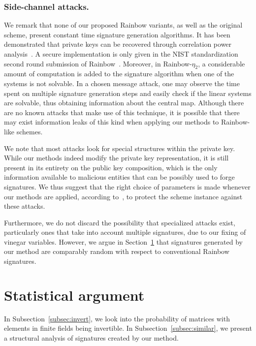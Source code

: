 \documentclass[12pt, a4paper, oneside]{memoir}
\theoremstyle{definition}
\begin{document}
\subsubsection{Side-channel attacks.} 

We remark that none of our proposed Rainbow variants, as well as the original scheme, present constant time signature generation algorithms. It has been demonstrated that private keys can be recovered through correlation power analysis~\cite{Park:201808}. A secure implementation is only given in the NIST standardization second round submission of Rainbow~\cite{Ding:201901}. Moreover, in Rainbow-$\eta_2$, a considerable amount of computation is added to the signature algorithm when one of the systems is not solvable. In a chosen message attack, one may observe the time spent on multiple signature generation steps and easily check if the linear systems are solvable, thus obtaining information about the central map. Although there are no known attacks that make use of this technique, it is possible that there may exist information leaks of this kind when applying our methods to Rainbow-like schemes.

\vspace{4mm}\noindent
We note that most attacks look for special structures within the private key. While our methods indeed modify the private key representation, it is still present in its entirety on the public key composition, which is the only information available to malicious entities that can be possibly used to forge signatures. We thus suggest that the right choice of parameters is made whenever our methods are applied, according to~\cite{Petzoldt:201005}, to protect the scheme instance against these attacks.

Furthermore, we do not discard the possibility that specialized attacks exist, particularly ones that take into account multiple signatures, due to our fixing of vinegar variables. However, we argue in Section~\ref{sec:stats} that signatures generated by our method are comparably random with respect to conventional Rainbow signatures. 

\section{Statistical argument}\label{sec:stats}

In Subsection~\ref{subsec:invert}, we look into the probability of matrices with elements in finite fields being invertible. In Subsection~\ref{subsec:similar}, we present a structural analysis of signatures created by our method.
\end{document}
